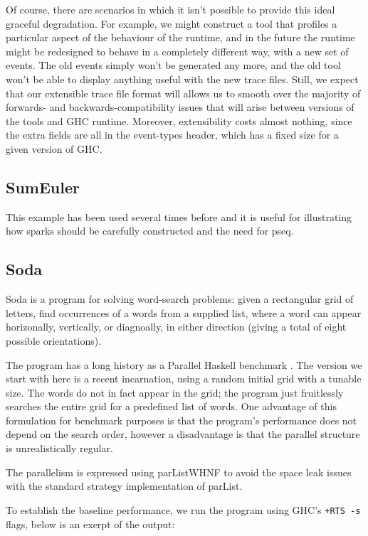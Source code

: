\documentclass[twocolumn,9pt]{sigplanconf}
\newcommand{\codef}[1]{{\fontfamily{cmss}\small#1}}
\let\cite=\citep
\begin{document}
Of course, there are scenarios in which it isn't possible to provide
this ideal graceful degradation.  For example, we might construct a
tool that profiles a particular aspect of the behaviour of the
runtime, and in the future the runtime might be redesigned to behave
in a completely different way, with a new set of events.  The old
events simply won't be generated any more, and the old tool won't be
able to display anything useful with the new trace files.  Still, we
expect that our extensible trace file format will allows us to smooth
over the majority of forwards- and backwards-compatibility issues that
will arise between versions of the tools and GHC runtime.  Moreover,
extensibility costs almost nothing, since the extra fields are all in
the event-types header, which has a fixed size for a given version of
GHC.

\subsection{SumEuler}
This example has been used several times before and it is useful for illustrating how sparks should be carefully constructed and the need for pseq.

\subsection{Soda}

Soda is a program for solving word-search problems: given a
rectangular grid of letters, find occurrences of a words from a
supplied list, where a word can appear horizonally, vertically, or
diagnoally, in either direction (giving a total of eight possible
orientations).

The program has a long history as a Parallel Haskell benchmark
\cite{soda}.  The version we start with here is a recent incarnation,
using a random initial grid with a tunable size.  The words do not in
fact appear in the grid; the program just fruitlessly searches the
entire grid for a predefined list of words.  One advantage of this
formulation for benchmark purposes is that the program's performance
does not depend on the search order, however a disadvantage is that
the parallel structure is unrealistically regular.

The parallelism is expressed using \codef{parListWHNF} \cite{multicore-ghc}
to avoid the space leak issues with the standard strategy
implementation of \codef{parList}.

To establish the baseline performance, we run the program using GHC's
\texttt{+RTS -s} flags, below is an exerpt of the output:
\end{document}
